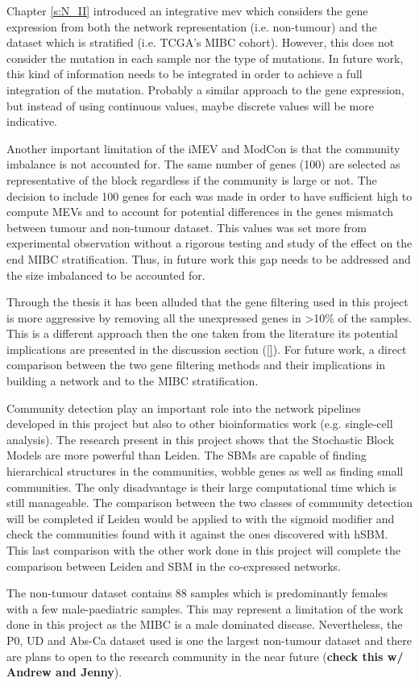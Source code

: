Chapter \cref{s:N_II} introduced an integrative \acrfull{mev} which considers the gene expression from both the network representation (i.e. non-tumour) and the dataset which is stratified (i.e. TCGA's MIBC cohort). However, this does not consider the mutation in each sample nor the type of mutations. In future work, this kind of information needs to be integrated in order to achieve a full integration of the mutation. Probably a similar approach to the gene expression, but instead of using continuous values, maybe discrete values will be more indicative.

Another important limitation of the iMEV and ModCon is that the community imbalance is not accounted for. The same number of genes (100) are selected as representative of the block regardless if the community is large or not. The decision to include 100 genes for each was made in order to have sufficient high to compute MEVs and to account for potential differences in the genes mismatch between tumour and non-tumour dataset. This values was set more from experimental observation without a rigorous testing and study of the effect on the end MIBC stratification. Thus, in future work this gap needs to be addressed and the size imbalanced to be accounted for.

Through the thesis it has been alluded that the gene filtering used in this project is more aggressive by removing all the unexpressed genes in >10\% of the samples. This is a different approach then the one taken from the literature its potential implications are presented in the discussion section (\ref{}). For future work, a direct comparison between the two gene filtering methods and their implications in building a network and to the MIBC stratification.

Community detection play an important role into the network pipelines developed in this project but also to other bioinformatics work (e.g. single-cell analysis). The research present in this project shows that the Stochastic Block Models are more powerful than Leiden. The SBMs are capable of finding hierarchical structures in the communities, wobble genes as well as finding small communities. The only disadvantage is their large computational time which is still manageable. The comparison between the two classes of community detection will be completed if Leiden would be applied to with the sigmoid modifier and check the communities found with it against the ones discovered with hSBM. This last comparison with the other work done in this project will complete the comparison between Leiden and SBM in the co-expressed networks.

The non-tumour dataset contains 88 samples which is predominantly females with a few male-paediatric samples. This may represent a limitation of the work done in this project as the MIBC is a male dominated disease. Nevertheless, the P0, UD and Abs-Ca dataset used is one the largest non-tumour dataset and there are plans to open to the research community in the near future (\textbf{check this w/ Andrew and Jenny}).
